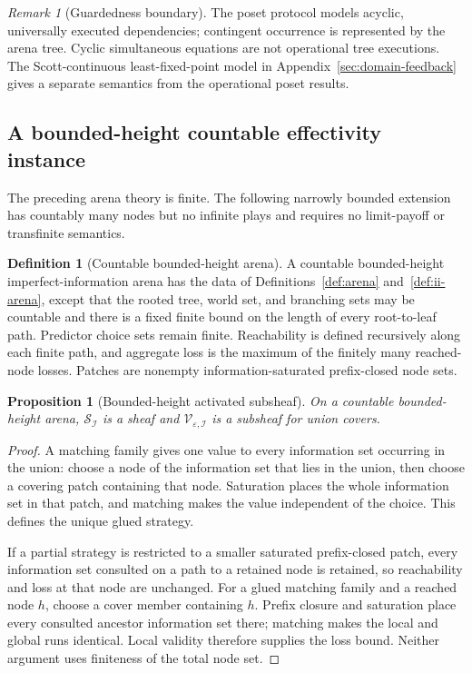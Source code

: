 \documentclass[11pt]{article}
\theoremstyle{plain}
\newtheorem{proposition}[theorem]{Proposition}
\theoremstyle{definition}
\newtheorem{definition}[theorem]{Definition}
\theoremstyle{remark}
\newtheorem{remark}[theorem]{Remark}
\newcommand{\eps}{\varepsilon}
\begin{document}
\begin{remark}[Guardedness boundary]
The poset protocol models acyclic, universally executed dependencies; contingent
occurrence is represented by the arena tree. Cyclic simultaneous equations are
not operational tree executions. The Scott-continuous least-fixed-point model in
Appendix~\ref{sec:domain-feedback} gives a separate semantics from the
operational poset results.
\end{remark}

\subsection{A bounded-height countable effectivity instance}

The preceding arena theory is finite. The following narrowly bounded extension
has countably many nodes but no infinite plays and requires no limit-payoff or
transfinite semantics.

\begin{definition}[Countable bounded-height arena]
\label{def:countable-bounded-arena}
A countable bounded-height imperfect-information arena has the data of
Definitions~\ref{def:arena} and~\ref{def:ii-arena}, except that the rooted tree,
world set, and branching sets may be countable and there is a fixed finite bound
on the length of every root-to-leaf path. Predictor choice sets remain finite.
Reachability is defined recursively along each finite path, and aggregate loss
is the maximum of the finitely many reached-node losses. Patches are nonempty
information-saturated prefix-closed node sets.
\end{definition}

\begin{proposition}[Bounded-height activated subsheaf]
\label{prop:bounded-activated-sheaf}
On a countable bounded-height arena,
$\mathscr S_{\mathcal I}$ is a sheaf and
$\mathscr V_{\eps,\mathcal I}$ is a subsheaf for union covers.
\end{proposition}

\begin{proof}
A matching family gives one value to every information set occurring in the
union: choose a node of the information set that lies in the union, then choose a
covering patch containing that node. Saturation places the whole information set
in that patch, and matching makes the value
independent of the choice. This defines the unique glued strategy.

If a partial strategy is restricted to a smaller saturated prefix-closed patch,
every information set consulted on a path to a retained node is retained, so
reachability and loss at that node are unchanged. For a glued matching family
and a reached node $h$, choose a cover member containing $h$. Prefix closure and
saturation place every consulted ancestor information set there; matching makes
the local and global runs identical. Local validity therefore supplies the loss
bound. Neither argument uses finiteness of the total node set.
\end{proof}
\end{document}
